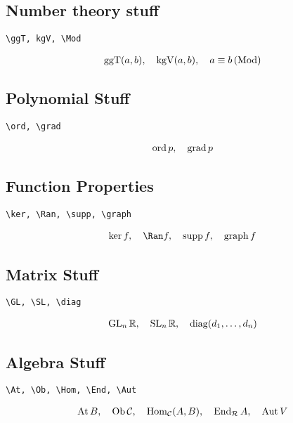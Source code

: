 \documentclass{article}
\begin{document}
\subsection{Number theory stuff}

\verb|\ggT, kgV, \Mod|

\begin{align*}
    \operatorname{ggT} (a, b),
    \quad
    \operatorname{kgV} (a, b),
    \quad
    a \equiv b \, (\operatorname{Mod})
\end{align*}

\subsection{Polynomial Stuff}

\verb|\ord, \grad|

\begin{align*}
    \operatorname{ord} p,
    \quad
    \operatorname{grad} p
\end{align*}

\subsection{Function Properties}

\verb|\ker, \Ran, \supp, \graph|

\begin{align*}
    \ker f,
    \quad
    \Ran f,
    \quad
    \supp f,
    \quad
    \graph f
\end{align*}

\subsection{Matrix Stuff}

\verb|\GL, \SL, \diag|

\begin{align*}
    \operatorname{GL}_n \mathbb{R},
    \quad
    \operatorname{SL}_n \mathbb{R},
    \quad
    \operatorname{diag} (d_1, \dots, d_n)
\end{align*}

\subsection{Algebra Stuff}

\verb|\At, \Ob, \Hom, \End, \Aut|

\begin{align*}
    \operatorname{At} B,
    \quad
    \operatorname{Ob} \mathcal{C},
    \quad
    \operatorname{Hom}_{\mathcal{C}} (A, B),
    \quad
    \operatorname{End}_{\mathcal{R}} A,
    \quad
    \operatorname{Aut} V
\end{align*}
\end{document}
